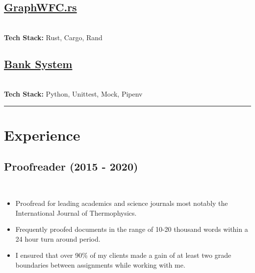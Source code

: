 \documentclass[12pt]{IEEEtran}
\newcommand{\cvrule}{\noindent\rule{8.5cm}{0.4pt}}
\begin{document}
\subsection*{\href{https://github.com/SaiskiFunctions/GraphWFC.rs}{GraphWFC.rs}}
 \\[5pt]
\textbf{Tech Stack:} Rust, Cargo, Rand

\iffalse
\subsection*{\href{https://github.com/dpwdec/Makersbnb}{Maker's B'n'B}}
\noindent{A full stack clone of Air B'n'B using entirely Ruby-based frameworks and libraries.} \\[5pt]
\textbf{Tech Stack:} Ruby, Sinatra, Sinatra-Flash, Bcrypt, Pony, RSpec, Capybara, PostgreSQL
\fi

\subsection*{\href{https://github.com/dpwdec/bank-tech-test}{Bank System}}
 \\[5pt]
\textbf{Tech Stack:} Python, Unittest, Mock, Pipenv

\cvrule
\vskip 0.35in

\section*{\textbf{Experience}}

\subsection*{Proofreader (2015 - 2020)}
\\[1pt]
\begin{itemize}
\item Proofread for leading academics and science journals most notably the International Journal of Thermophysics.
\item Frequently proofed documents in the range of 10-20 thousand words within a 24 hour turn around period.
\item I ensured that over 90\% of my clients made a gain of at least two grade boundaries between assignments while working with me.
\end{itemize}
\end{document}
